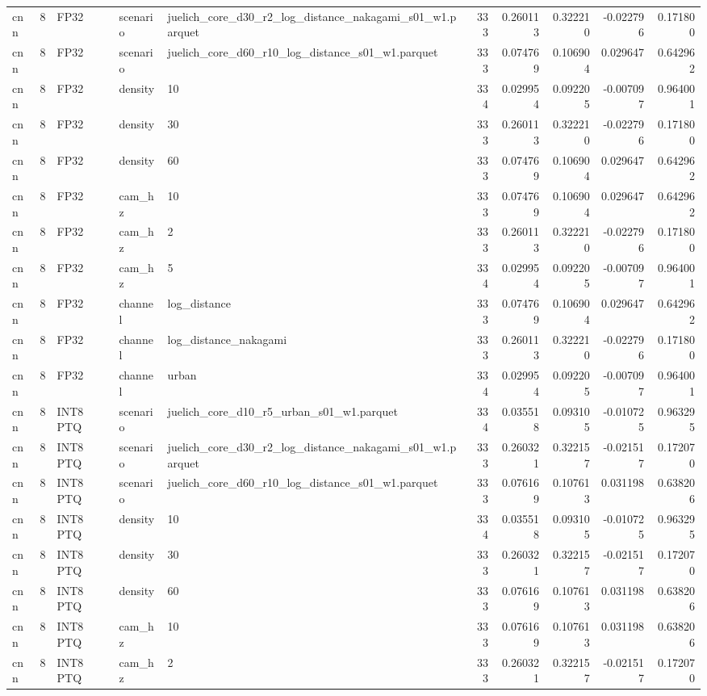 \begin{tabular}{lrlllrrrrr}
cnn & 8 & FP32 & scenario & juelich\_core\_d30\_r2\_log\_distance\_nakagami\_s01\_w1.parquet & 333 & 0.260113 & 0.322210 & -0.022796 & 0.171800 \\
cnn & 8 & FP32 & scenario & juelich\_core\_d60\_r10\_log\_distance\_s01\_w1.parquet & 333 & 0.074769 & 0.106904 & 0.029647 & 0.642962 \\
cnn & 8 & FP32 & density & 10 & 334 & 0.029954 & 0.092205 & -0.007097 & 0.964001 \\
cnn & 8 & FP32 & density & 30 & 333 & 0.260113 & 0.322210 & -0.022796 & 0.171800 \\
cnn & 8 & FP32 & density & 60 & 333 & 0.074769 & 0.106904 & 0.029647 & 0.642962 \\
cnn & 8 & FP32 & cam\_hz & 10 & 333 & 0.074769 & 0.106904 & 0.029647 & 0.642962 \\
cnn & 8 & FP32 & cam\_hz & 2 & 333 & 0.260113 & 0.322210 & -0.022796 & 0.171800 \\
cnn & 8 & FP32 & cam\_hz & 5 & 334 & 0.029954 & 0.092205 & -0.007097 & 0.964001 \\
cnn & 8 & FP32 & channel & log\_distance & 333 & 0.074769 & 0.106904 & 0.029647 & 0.642962 \\
cnn & 8 & FP32 & channel & log\_distance\_nakagami & 333 & 0.260113 & 0.322210 & -0.022796 & 0.171800 \\
cnn & 8 & FP32 & channel & urban & 334 & 0.029954 & 0.092205 & -0.007097 & 0.964001 \\
cnn & 8 & INT8 PTQ & scenario & juelich\_core\_d10\_r5\_urban\_s01\_w1.parquet & 334 & 0.035518 & 0.093105 & -0.010725 & 0.963295 \\
cnn & 8 & INT8 PTQ & scenario & juelich\_core\_d30\_r2\_log\_distance\_nakagami\_s01\_w1.parquet & 333 & 0.260321 & 0.322157 & -0.021517 & 0.172070 \\
cnn & 8 & INT8 PTQ & scenario & juelich\_core\_d60\_r10\_log\_distance\_s01\_w1.parquet & 333 & 0.076169 & 0.107613 & 0.031198 & 0.638206 \\
cnn & 8 & INT8 PTQ & density & 10 & 334 & 0.035518 & 0.093105 & -0.010725 & 0.963295 \\
cnn & 8 & INT8 PTQ & density & 30 & 333 & 0.260321 & 0.322157 & -0.021517 & 0.172070 \\
cnn & 8 & INT8 PTQ & density & 60 & 333 & 0.076169 & 0.107613 & 0.031198 & 0.638206 \\
cnn & 8 & INT8 PTQ & cam\_hz & 10 & 333 & 0.076169 & 0.107613 & 0.031198 & 0.638206 \\
cnn & 8 & INT8 PTQ & cam\_hz & 2 & 333 & 0.260321 & 0.322157 & -0.021517 & 0.172070 \\

\end{tabular}
